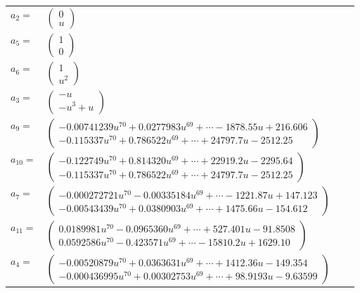 \documentclass[1p]{elsarticle_modified}
\theoremstyle{definition}
\begin{document}
\begin{tabular}{m{7pt} m{180pt} m{7pt} m{180pt} }
\flushright $a_{2}=$&$\begin{pmatrix}0\\u\end{pmatrix}$ \\
\flushright $a_{5}=$&$\begin{pmatrix}1\\0\end{pmatrix}$ \\
\flushright $a_{6}=$&$\begin{pmatrix}1\\u^2\end{pmatrix}$ \\
\flushright $a_{3}=$&$\begin{pmatrix}- u\\- u^3+u\end{pmatrix}$ \\
\flushright $a_{9}=$&$\begin{pmatrix}-0.00741239 u^{70}+0.0277983 u^{69}+\cdots-1878.55 u+216.606\\-0.115337 u^{70}+0.786522 u^{69}+\cdots+24797.7 u-2512.25\end{pmatrix}$ \\
\flushright $a_{10}=$&$\begin{pmatrix}-0.122749 u^{70}+0.814320 u^{69}+\cdots+22919.2 u-2295.64\\-0.115337 u^{70}+0.786522 u^{69}+\cdots+24797.7 u-2512.25\end{pmatrix}$ \\
\flushright $a_{7}=$&$\begin{pmatrix}-0.000272721 u^{70}-0.00335184 u^{69}+\cdots-1221.87 u+147.123\\-0.00543439 u^{70}+0.0380903 u^{69}+\cdots+1475.66 u-154.612\end{pmatrix}$ \\
\flushright $a_{11}=$&$\begin{pmatrix}0.0189981 u^{70}-0.0965360 u^{69}+\cdots+527.401 u-91.8508\\0.0592586 u^{70}-0.423571 u^{69}+\cdots-15810.2 u+1629.10\end{pmatrix}$ \\
\flushright $a_{4}=$&$\begin{pmatrix}-0.00520879 u^{70}+0.0363631 u^{69}+\cdots+1412.36 u-149.354\\-0.000436995 u^{70}+0.00302753 u^{69}+\cdots+98.9193 u-9.63599\end{pmatrix}$ \\

\end{tabular}
\end{document}
